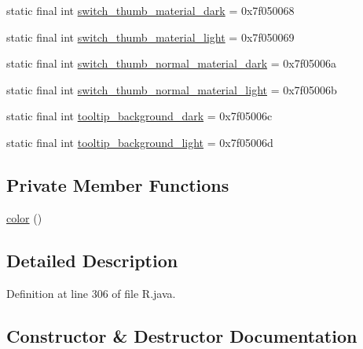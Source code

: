 \begin{DoxyCompactItemize}
\item 
static final int \mbox{\hyperlink{classandroid_1_1support_1_1v7_1_1appcompat_1_1_r_1_1color_ab3f5b30d869ad8079583dcb3ca70c48a}{switch\+\_\+thumb\+\_\+material\+\_\+dark}} = 0x7f050068
\item 
static final int \mbox{\hyperlink{classandroid_1_1support_1_1v7_1_1appcompat_1_1_r_1_1color_a7c510dd45c37c40591c33a8e683bba44}{switch\+\_\+thumb\+\_\+material\+\_\+light}} = 0x7f050069
\item 
static final int \mbox{\hyperlink{classandroid_1_1support_1_1v7_1_1appcompat_1_1_r_1_1color_a6854a559785b1a0afe28f5a77b586c04}{switch\+\_\+thumb\+\_\+normal\+\_\+material\+\_\+dark}} = 0x7f05006a
\item 
static final int \mbox{\hyperlink{classandroid_1_1support_1_1v7_1_1appcompat_1_1_r_1_1color_a4b8ce6e9c94accbc194f64dc674513a0}{switch\+\_\+thumb\+\_\+normal\+\_\+material\+\_\+light}} = 0x7f05006b
\item 
static final int \mbox{\hyperlink{classandroid_1_1support_1_1v7_1_1appcompat_1_1_r_1_1color_a265528155b2e1e4e6dd997513928e093}{tooltip\+\_\+background\+\_\+dark}} = 0x7f05006c
\item 
static final int \mbox{\hyperlink{classandroid_1_1support_1_1v7_1_1appcompat_1_1_r_1_1color_aaebcd03ad73492f72e31f7ae1a5e949f}{tooltip\+\_\+background\+\_\+light}} = 0x7f05006d
\end{DoxyCompactItemize}
\subsection*{Private Member Functions}
\begin{DoxyCompactItemize}
\item 
\mbox{\hyperlink{classandroid_1_1support_1_1v7_1_1appcompat_1_1_r_1_1color_a940a52e8a39366338ef06b09d9f7c42d}{color}} ()
\end{DoxyCompactItemize}


\subsection{Detailed Description}


Definition at line 306 of file R.\+java.



\subsection{Constructor \& Destructor Documentation}
\mbox{\label{classandroid_1_1support_1_1v7_1_1appcompat_1_1_r_1_1color_a940a52e8a39366338ef06b09d9f7c42d}} 
